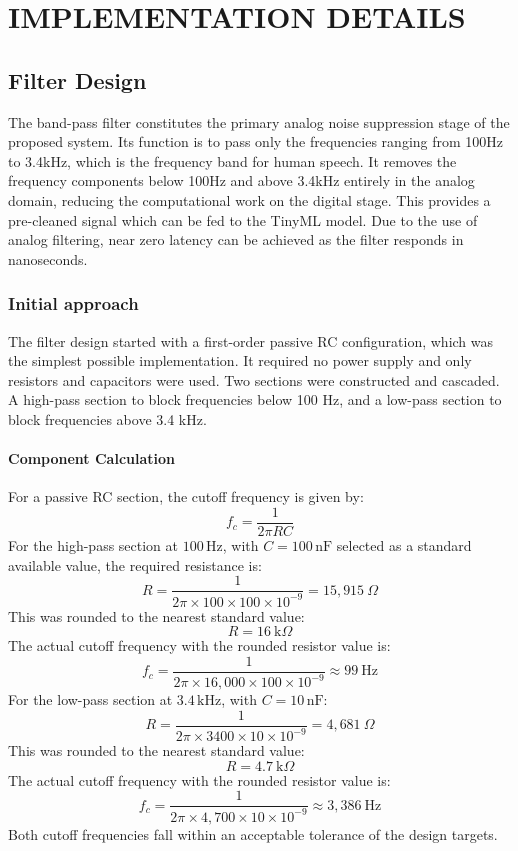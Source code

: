 \chapter{IMPLEMENTATION DETAILS}


\section{Filter Design}

The band-pass filter constitutes the primary analog noise suppression stage of the proposed system. Its function is to pass only the frequencies ranging from 100Hz to 3.4kHz, which is the frequency band for human speech. It removes the frequency components below 100Hz and above 3.4kHz entirely in the analog domain, reducing the computational work on the digital stage. This provides a pre-cleaned signal which can be fed to the TinyML model. Due to the use of analog filtering, near zero latency can be achieved as the filter responds in nanoseconds. 


\subsection{Initial approach}

The filter design started with a first-order passive RC configuration, which was the simplest possible implementation. It required no power supply and only resistors and capacitors were used. Two sections were constructed and cascaded. A high-pass section to block frequencies below 100 Hz, and a low-pass section to block frequencies above 3.4 kHz.

\subsubsection{Component Calculation}

For a passive RC section, the cutoff frequency is given by:
\begin{equation}    
    f_c = \frac{1}{2\pi RC}
\end{equation}
For the high-pass section at \(100\,\text{Hz}\), with \(C = 100\,\text{nF}\) selected as a standard available value, the required resistance is:
\[
R = \frac{1}{2\pi \times 100 \times 100 \times 10^{-9}}
= 15,\!915~\Omega
\]
This was rounded to the nearest standard value:
\[
R = 16~\text{k}\Omega
\]
The actual cutoff frequency with the rounded resistor value is:
\[
f_c = \frac{1}{2\pi \times 16,\!000 \times 100 \times 10^{-9}}
\approx 99~\text{Hz}
\]
For the low-pass section at \(3.4\,\text{kHz}\), with \(C = 10\,\text{nF}\):
\[
R = \frac{1}{2\pi \times 3400 \times 10 \times 10^{-9}}
= 4,\!681~\Omega
\]
This was rounded to the nearest standard value:
\[
R = 4.7~\text{k}\Omega
\]
The actual cutoff frequency with the rounded resistor value is:
\[
f_c = \frac{1}{2\pi \times 4,\!700 \times 10 \times 10^{-9}}
\approx 3,\!386~\text{Hz}
\]
Both cutoff frequencies fall within an acceptable tolerance of the design targets.

